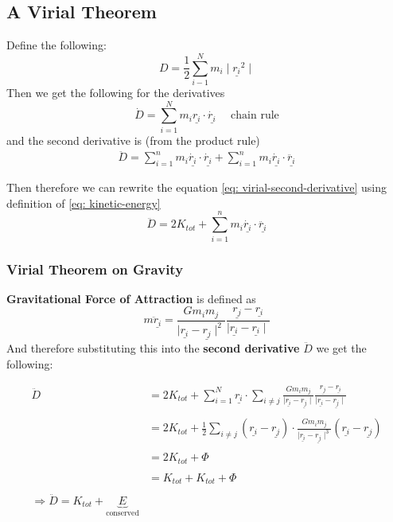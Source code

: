 \subsection{A Virial Theorem}
Define the following:
$$D = \frac{1}{2}\sum_{i-1}^{N}m_{i} \mid \underline{r_{i}}^{2} \mid$$
Then we get the following for the derivatives
$$\dot{D} = \sum_{i=1}^{N}m_{i}\underline{r_{i}} \cdot \underline{\dot{r_{i}}} \ \ \ \ \ \ \text{chain
rule}$$
and the second derivative is (from the product rule)
\begin{align*}
  \ddot{D} = \sum_{i=1}^{n}m_{i}\underline{\dot{r_{i}}}\cdot \underline{\dot{r_{i}}} + \sum_{i=1}^{n}m_{i}\underline{\dot{r_{i}}}\cdot\underline{\ddot{r_{i}}}\label{eq: virial-second-derivative} \tag{$*$}
\end{align*}

Then therefore we can rewrite the equation \eqref{eq: virial-second-derivative}
using definition of \eqref{eq: kinetic-energy}
$$\ddot{D} = 2K_{tot} +   \sum_{i=1}^{n}m_{i}\underline{\dot{r_{i}}}\cdot\underline{\ddot{r_{i}}} $$
\subsubsection{Virial Theorem on Gravity}
{\bf Gravitational Force of Attraction} is defined as
$$m\underline{\ddot{r}_{i}} = \frac{Gm_{i}m_{j}}{\mid\underline{r_{i}} -\underline{r_{j}}\mid^{2}}
\frac{\underline{r_{j}} - \underline{r_{i}}}{\mid \underline{r_{i}} - \underline{r_{i}} \mid}$$
And therefore substituting this into the {\bf second derivative} $\ddot{D}$ we
get the following:

\begin{align*}
  \ddot{D} &= 2K_{tot} + \sum_{i=1}^{N}\underline{r_{i}} \cdot \sum_{i \neq j}\frac{Gm_{i}m_{j}}{\mid \underline{r_{i}}- \underline{r_{j}} \mid} \frac{\underline{r_{j}} - \underline{r_{i}}}{\mid \underline{r_{i}} - \underline{r_{j}} \mid} \\ \\
           &= 2K_{tot} + \frac{1}{2}\sum_{i \neq j}(\underline{r_{i}} - \underline{r_{j}}) \cdot \frac{Gm_{i}m_{j}}{\mid \underline{r_{i}} - \underline{r_{j}} \mid^{3}}(\underline{r_{i}} - \underline{r_{j}}) \\ \\
           &= 2K_{tot} + \Phi \\ \\
           &= K_{tot} + K_{tot} + \Phi \\ \\
  \Rightarrow \ddot{D} = K_{tot} + \underbrace{E}_{\text{conserved}}
\end{align*}
\clearpage

